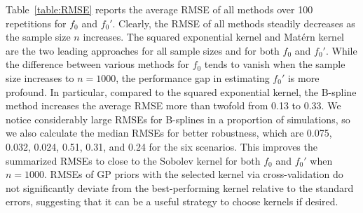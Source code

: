 \documentclass[12pt]{article}
\theoremstyle{plain}
\theoremstyle{nonitalicremark}
\begin{document}
Table~\ref{table:RMSE} reports the average RMSE of all methods over 100 repetitions for $f_0$ and $f_0'$. Clearly, the RMSE of all methods steadily decreases as the sample size $n$ increases. The squared exponential kernel and Mat\'ern kernel are the two leading approaches for all sample sizes and for both $f_0$ and $f_0'$. While the difference between various methods for $f_0$ tends to vanish when the sample size increases to $n = 1000$, the performance gap in estimating $f_0'$ is more profound. In particular, compared to the squared exponential kernel, the B-spline method increases the average RMSE more than twofold from 0.13 to 0.33. We notice considerably large RMSEs for B-splines in a proportion of simulations, so we also calculate the median RMSEs for better robustness, which are 0.075, 0.032, 0.024, 0.51, 0.31, and 0.24 for the six scenarios. This improves the summarized RMSEs to close to the Sobolev kernel for both $f_0$ and $f_0'$ when $n = 1000$. RMSEs of GP priors with the selected kernel via cross-validation do not significantly deviate from the best-performing kernel relative to the standard errors, suggesting that it can be a useful strategy to choose kernels if desired. 



\setlength{\tabcolsep}{4pt}
\begin{table}
\centering
\caption{RMSE of estimating $f_0$ and $f_0'$, averaged over 100 repetitions. The first four rows are the plug-in GP prior with various kernels (Mat\'ern kernel, squared exponential kernel, second-order Sobolev kernel, and the selected kernel via cross-validation). The last row is the random series prior using B-splines. Standard deviations are provided in parentheses.
\vspace{0.2in}
\label{table:RMSE}} 
\end{table}
\end{document}
